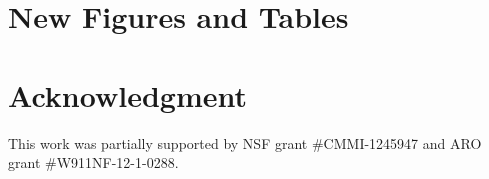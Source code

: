 \documentclass{article}
\begin{document}












\section{New Figures and Tables}





















\section*{Acknowledgment}
This work was partially supported by NSF grant \#CMMI-1245947 and ARO
grant \#W911NF-12-1-0288.



\end{document}
